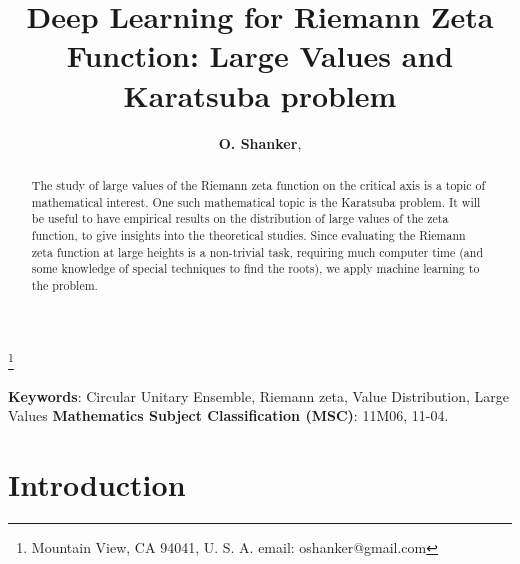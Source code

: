 \documentclass[twoside]{article}
\begin{document}


\newtheorem{theorem}{Theorem}[section]
\newtheorem{lemma}[theorem]{Lemma}

\theoremstyle{definition}
\newtheorem{definition}[theorem]{Definition}
\newtheorem{example}[theorem]{Example}
\newtheorem{xca}[theorem]{Exercise}

\theoremstyle{remark}
\newtheorem{remark}[theorem]{Remark}



\date{}
\lhead[]{}
\rhead[]{}

\title{\bf{Deep Learning for Riemann Zeta Function: Large Values and Karatsuba problem}}

\maketitle


\author{{\textbf{O. Shanker}},}
\thanks{ Mountain View, CA 94041, U. S. A. email: oshanker@gmail.com}

\thispagestyle{fancy}

\begin{abstract}
The study of large values of the Riemann zeta function on the critical axis is a topic of mathematical
interest.  One such mathematical topic is the Karatsuba problem. It will be useful to have empirical results on the distribution of large values of the zeta function, to give insights 
into the theoretical studies.  Since evaluating the Riemann zeta function at large heights  is a non-trivial task, requiring much computer time 
(and some knowledge of special techniques to find the roots), we apply
machine learning to the problem.

\end{abstract}
{\textbf {Keywords}:} Circular Unitary Ensemble, Riemann zeta, Value Distribution,  Large Values 
{\textbf {Mathematics Subject Classification (MSC)}:} 11M06, 11-04.


\symbolfootnote[0]{*}


\section{Introduction}
\end{document}
